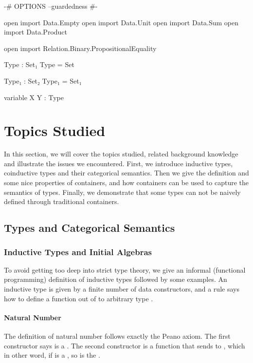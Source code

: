 \begin{code}[hide]
{-# OPTIONS --guardedness #-}

open import Data.Empty
open import Data.Unit
open import Data.Sum
open import Data.Product

open import Relation.Binary.PropositionalEquality

Type : Set₁
Type = Set

Type₁ : Set₂
Type₁ = Set₁

variable X Y : Type
\end{code}

\chapter{Topics Studied}

In this section, we will cover the topics studied, related background knowledge and illustrate the issues we encountered. First, we introduce inductive types, coinductive types and their categorical semantics. Then we give the definition and some nice properties of containers, and how containers can be used to capture the semantics of types. Finally, we demonstrate that some types can not be naively defined through traditional containers.

\section{Types and Categorical Semantics}

\subsection{Inductive Types and Initial Algebras}

To avoid getting too deep into strict type theory, we give an informal (functional programming) definition of inductive types followed by some examples. An inductive type  is given by a finite number of data constructors, and a rule says how to define a function out of  to arbitrary type .

\subsubsection*{Natural Number}

The definition of natural number  follows exactly the Peano axiom. The first constructor says  is a . The second constructor is a function that sends  to , which in other word, if  is a , so is the . 


